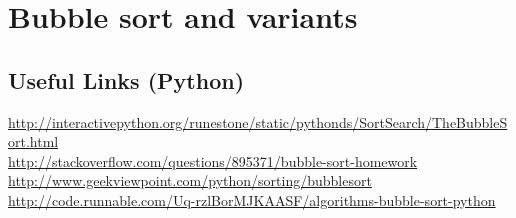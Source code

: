 \documentclass{article}
\begin{document}
\section{Bubble sort and variants}

\subsection{Useful Links (Python)}
\href{http://interactivepython.org/runestone/static/pythonds/SortSearch/TheBubbleSort.html}{http://interactivepython.org/runestone/static/pythonds/SortSearch/TheBubbleSort.html}\\
\href{http://stackoverflow.com/questions/895371/bubble-sort-homework}{http://stackoverflow.com/questions/895371/bubble-sort-homework}\\
\href{http://www.geekviewpoint.com/python/sorting/bubblesort}{http://www.geekviewpoint.com/python/sorting/bubblesort}\\
\href{http://code.runnable.com/Uq-rzlBorMJKAASF/algorithms-bubble-sort-python}{http://code.runnable.com/Uq-rzlBorMJKAASF/algorithms-bubble-sort-python}
\end{document}
